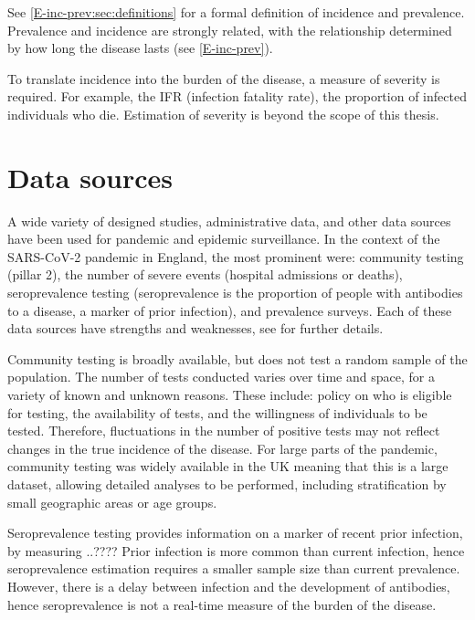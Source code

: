 \documentclass[thesis.tex]{subfiles}
\begin{document}
See \cref{E-inc-prev:sec:definitions} for a formal definition of incidence and prevalence.
Prevalence and incidence are strongly related, with the relationship determined by how long the disease lasts (see \cref{E-inc-prev}).

To translate incidence into the burden of the disease, a measure of severity is required.
For example, the IFR (infection fatality rate), the proportion of infected individuals who die.
Estimation of severity is beyond the scope of this thesis.

\section{Data sources} \label{intro:sec:data-sources}

A wide variety of designed studies, administrative data, and other data sources have been used for pandemic and epidemic surveillance.
In the context of the SARS-CoV-2 pandemic in England, the most prominent were: community testing (pillar 2), the number of severe events (\eg hospital admissions or deaths), seroprevalence testing (seroprevalence is the proportion of people with antibodies to a disease, a marker of prior infection), and prevalence surveys.
Each of these data sources have strengths and weaknesses, see \textcite{royalSocietyRnumber} for further details.

Community testing is broadly available, but does not test a random sample of the population.
The number of tests conducted varies over time and space, for a variety of known and unknown reasons.
These include: policy on who is eligible for testing, the availability of tests, and the willingness of individuals to be tested.
Therefore, fluctuations in the number of positive tests may not reflect changes in the true incidence of the disease.
For large parts of the pandemic, community testing was widely available in the UK meaning that this is a large dataset, allowing detailed analyses to be performed, including stratification by small geographic areas or age groups.

Seroprevalence testing provides information on a marker of recent prior infection, by measuring ..????
Prior infection is more common than current infection, hence seroprevalence estimation requires a smaller sample size than current prevalence.
However, there is a delay between infection and the development of antibodies, hence seroprevalence is not a real-time measure of the burden of the disease.
\end{document}
